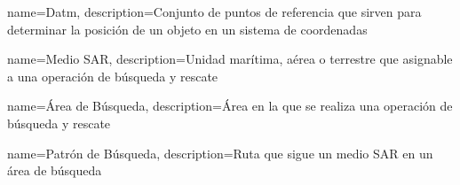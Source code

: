 
{
    name=Datm,
    description={Conjunto de puntos de referencia que sirven para determinar la posición de un objeto en un sistema de coordenadas}
}

{
    name=Medio SAR,
    description={Unidad marítima, aérea o terrestre que asignable a una operación de búsqueda y rescate}
}

{
    name=Área de Búsqueda,
    description={Área en la que se realiza una operación de búsqueda y rescate}
}

{
    name=Patrón de Búsqueda,
    description={Ruta que sigue un medio SAR en un área de búsqueda}
}